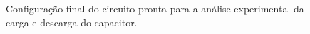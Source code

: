 \documentclass[12pt,a4paper]{article}
\begin{document}
\begin{figure}[H]
    \centering
    \caption{Configuração final do circuito pronta para a análise experimental da carga e descarga do capacitor.}
    \label{fig:foto07}
\end{figure}
\end{document}
